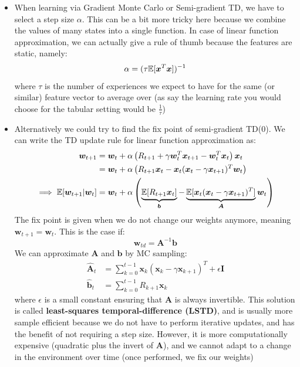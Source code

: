 \begin{itemize}
	\item When learning via Gradient Monte Carlo or Semi-gradient TD, we have to select a step size $\alpha$. This can be a bit more tricky here because we combine the values of many states into a single function. In case of linear function approximation, we can actually give a rule of thumb because the features are static, namely:
	$$\alpha = (\tau\mathbb{E}[\bm{x}^T\bm{x}])^{-1}$$
	where $\tau$ is the number of experiences we expect to have for the same (or similar) feature vector to average over (as say the learning rate you would choose for the tabular setting would be $\frac{1}{\tau}$)
	\item Alternatively we could try to find the fix point of semi-gradient TD(0). We can write the TD update rule for linear function approximation as:
	\begin{equation*}
		\begin{split}
			\bm{w}_{t+1} & = \bm{w}_t + \alpha \left(R_{t+1}+\gamma \bm{w}_t^T \bm{x}_{t+1} - \bm{w}_t^T\bm{x}_t\right)\bm{x}_t\\
			& = \bm{w}_t + \alpha \left(R_{t+1}\bm{x}_t - \bm{x}_t (\bm{x}_t - \gamma \bm{x}_{t+1})^T \bm{w}_t\right)\\
			\implies \mathbb{E}[\bm{w}_{t+1}|\bm{w}_t] & = \bm{w}_t + \alpha \left(\underbrace{\mathbb{E}[R_{t+1}\bm{x}_t]}_{\bm{b}} - \underbrace{\mathbb{E}[\bm{x}_t (\bm{x}_t - \gamma \bm{x}_{t+1})^T]}_{\bm{A}} \bm{w}_t\right)\\
		\end{split}
	\end{equation*}
	The fix point is given when we do not change our weights anymore, meaning $\bm{w}_{t+1}=\bm{w}_t$. This is the case if:
	$$\bm{w}_{td}=\bm{A}^{-1}\bm{b}$$
	We can approximate $\bm{A}$ and $\bm{b}$ by MC sampling:
	\begin{equation*}
		\begin{split}
			\hat{\bm{A}}_t & = \sum_{k=0}^{t-1}\bm{x}_k\left(\bm{x}_k - \gamma\bm{x}_{k+1}\right)^T + \epsilon\bm{I}\\
			\hat{\bm{b}}_t & = \sum_{k=0}^{t-1}R_{k+1}\bm{x}_k
		\end{split}
	\end{equation*}
	where $\epsilon$ is a small constant ensuring that $\bm{\hat{A}}$ is always invertible. This solution is called \textbf{least-squares temporal-difference (LSTD)}, and is usually more sample efficient because we do not have to perform iterative updates, and has the benefit of not requiring a step size. However, it is more computationally expensive (quadratic plus the invert of $\bm{A}$), and we cannot adapt to a change in the environment over time (once performed, we fix our weights)
\end{itemize}
